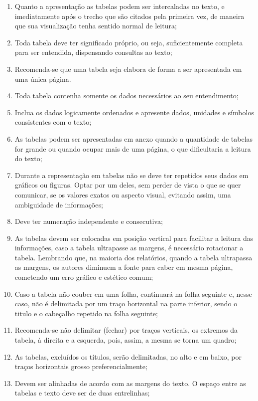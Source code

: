 \begin{enumerate}
\item Quanto a apresentação as tabelas podem ser intercaladas no texto, e imediatamente após o trecho que são citados pela primeira vez, de maneira que sua visualização tenha sentido normal de leitura;  
\item Toda tabela deve ter significado próprio, ou seja, suficientemente completa para ser entendida, dispensando consultas ao texto; 
\item Recomenda-se que uma tabela seja elabora
de forma a ser apresentada em uma única página.
\item Toda tabela contenha somente os dados necessários ao seu entendimento;
\item Inclua os dados logicamente ordenados e apresente dados, unidades e símbolos consistentes com o texto;
\item As tabelas podem ser apresentadas em anexo quando a quantidade de tabelas for grande ou quando ocupar mais de uma página, o que dificultaria a leitura do texto; 
\item Durante a representação em tabelas não se deve ter repetidos seus dados em gráficos ou figuras. Optar por um deles, sem perder de vista o que se quer comunicar, se os valores exatos ou aspecto visual, evitando assim, uma ambiguidade de informações;
\item Deve ter numeração independente e consecutiva; 
\item As tabelas devem ser colocadas em posição vertical para facilitar a leitura das informações, caso a tabela ultrapasse as margens, é necessário rotacionar a tabela. Lembrando que, na maioria dos relatórios, quando a tabela ultrapassa as margens, os autores diminuem a fonte para caber em mesma página, cometendo um erro gráfico e estético comum; 
\item Caso a tabela não couber em uma folha,
continuará na folha seguinte e, nesse caso, não é delimitada por
um traço horizontal na parte inferior, sendo o titulo e o
cabeçalho repetido na folha seguinte; 
\item Recomenda-se não
delimitar (fechar) por traços verticais, os extremos da tabela, à
direita e a esquerda, pois, assim, a mesma se torna um quadro;
\item As tabelas, excluídos os títulos, serão delimitadas, no alto e em baixo, por traços horizontais grosso preferencialmente;
\item Devem ser alinhadas de acordo com as margens do texto. O espaço entre as tabelas e texto deve ser de duas entrelinhas;

\end{enumerate}
